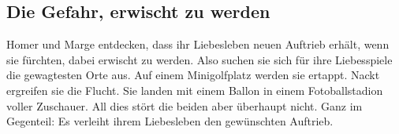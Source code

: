 	
\subsection{Die Gefahr, erwischt zu werden}\label{5F18}
Homer und Marge entdecken, dass ihr Liebesleben neuen Auftrieb erhält, wenn sie fürchten, dabei erwischt zu werden. Also suchen sie sich für ihre Liebesspiele die gewagtesten Orte aus. Auf einem Minigolfplatz werden sie ertappt. Nackt ergreifen sie die Flucht. Sie landen mit einem Ballon in einem Fotoballstadion voller Zuschauer. All dies stört die beiden aber überhaupt nicht. Ganz im Gegenteil: Es verleiht ihrem Liebesleben den gewünschten Auftrieb.

